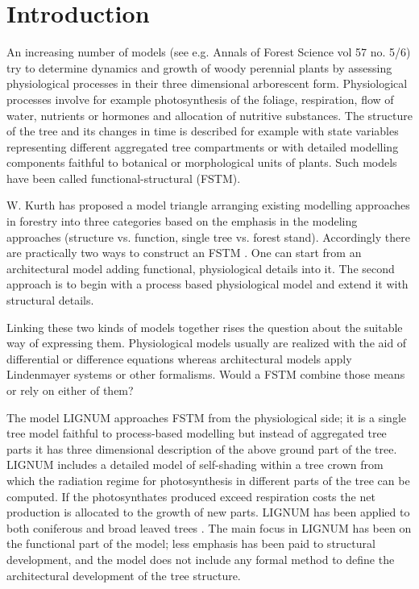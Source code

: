 \section{Introduction}
An increasing number of models  (see e.g. Annals of Forest Science vol
57 no.  5/6) try to determine  dynamics and growth  of woody perennial
plants by assessing physiological processes in their three dimensional
arborescent  form.    Physiological  processes  involve   for  example
photosynthesis of  the foliage, respiration, flow  of water, nutrients
or hormones and allocation  of nutritive substances.  The structure of
the tree and  its changes in time is described  for example with state
variables representing different  aggregated tree compartments or with
detailed modelling  components faithful to  botanical or morphological
units of  plants. Such  models have been  called functional-structural
(FSTM).

W.  Kurth has  proposed a  model triangle  \citep{kurth:94b} arranging
existing modelling approaches in  forestry into three categories based
on the  emphasis in the modeling approaches  (structure vs.  function,
single tree vs. forest  stand).  Accordingly there are practically two
ways to construct an FSTM  \citep{sievanen:00}.  One can start from an
architectural  model   \citep{jaeger:92,kurth:94}  adding  functional,
physiological details into it.  The second approach is to begin with a
process  based  physiological  model  \citep{makela:86,  landsberg:86,
sievanen:93} and extend it with structural details.

Linking these  two kinds of  models together rises the  question about
the suitable way of  expressing them. Physiological models usually are
realized  with  the  aid   of  differential  or  difference  equations
\citep{landsberg:86}  whereas architectural  models  apply Lindenmayer
systems  \citep{kurth:99,pp:90}  or  other  formalisms. Would  a  FSTM
combine those means or rely on either of them?

The model LIGNUM  approaches FSTM from the physiological  side; it is a
single  tree  model  \citep{perttunen:96}  faithful  to  process-based
modelling  \citep[see  e.g.][]{nikinmaa:92, sievanen:93,  makela:97-1}
but  instead  of  aggregated  tree  parts  it  has  three  dimensional
description of the  above ground part of the  tree.  LIGNUM includes a
detailed    model    of    self-shading    within   a    tree    crown
\citep{perttunen:96, perttunen:01} from which the radiation regime for
photosynthesis in different parts of the tree can be computed.  If the
photosynthates produced exceed respiration costs the net production is
allocated to the growth of new  parts. LIGNUM has been applied to both
coniferous   \citep{perttunen:96,lo:99}   and   broad   leaved   trees
\citep{perttunen:01}. The main focus in LIGNUM has been on the
functional  part  of  the  model;  less  emphasis  has  been  paid  to
structural  development, and  the model  does not  include  any formal
method to define the architectural development of the tree structure.

